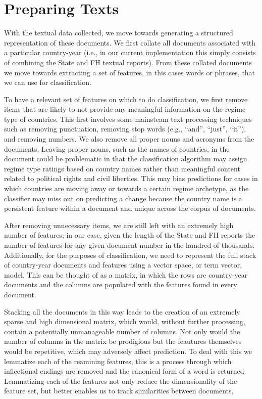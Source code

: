 \documentclass[pdftex,12pt,fullpage,oneside]{amsart}
\begin{document}
\section{Preparing Texts}

With the textual data collected, we move towards generating a structured representation of these documents. We first collate all documents associated with a particular country-year (i.e., in our current implementation this simply consists of combining the State and FH textual reports). From these collated documents we move towards extracting a set of features, in this cases words or phrases, that we can use for classification. 

To have a relevant set of features on which to do classification, we first remove items that are likely to not provide any meaningful information on the regime type of countries. This first involves some mainsteam text processing techniques such as removing punctuation, removing stop words (e.g., ``and'', ``just'', ``it''), and removing numbers. We also remove all proper nouns and acronyms from the documents. Leaving proper nouns, such as the names of countries, in the document could be problematic in that the classification algorithm may assign regime type ratings based on country names rather than meaningful content related to political rights and civil liberties. This may bias predictions for cases in which countries are moving away or towards a certain regime archetype, as the classifier may miss out on predicting a change because the country name is a persistent feature within a document and unique across the corpus of documents.

After removing unnecessary items, we are still left with an extremely high number of features; in our case, given the length of the State and FH reports the number of features for any given document number in the hundred of thousands. Additionally, for the purposes of classification, we need to represent the full stack of country-year documents and features using a vector space, or term vector, model. This can be thought of as a matrix, in which the rows are country-year documents and the columns are populated with the features found in every document. 

Stacking all the documents in this way leads to the creation of an extremely sparse and high dimensional matrix, which would, without further processing, contain a potentially unmanageable number of columns. Not only would the number of columns in the matrix be prodigious but the feautures themselves would be repetitive, which may adversely affect prediction. To deal with this we lemmatize each of the reamining features, this is a process through which inflectional endings are removed and the canonical form of a word is returned. Lemmatizing each of the features not only reduce the dimensionality of the feature set, but better enables us to track similarities between documents. 
\end{document}
